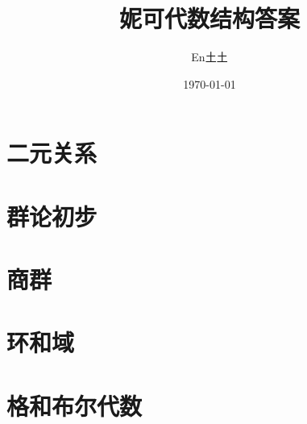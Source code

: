 \documentclass[UTF8]{ctexart}
\title{妮可代数结构答案}
\author{En土土}
\date{\today}
\begin{document}
\fancyfoot[C]{\thepage}

\maketitle
\tableofcontents
\newpage


\newpage


\newpage


\newpage

\section{二元关系}

\newpage

\section{群论初步}

\newpage

\section{商群}

\newpage

\section{环和域}

\newpage

\section{格和布尔代数}
\end{document}
